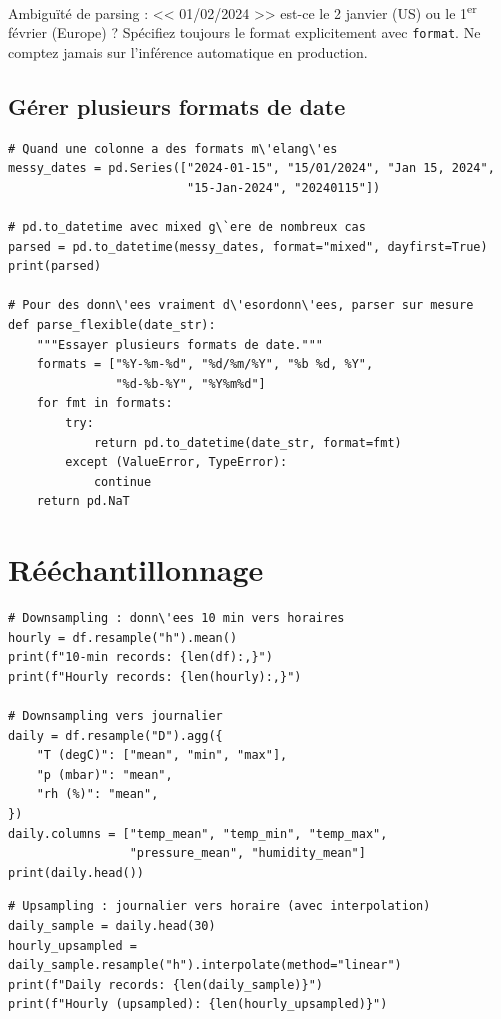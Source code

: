 \begin{warningbox}
Ambigu\"it\'e de parsing : << 01/02/2024 >> est-ce le 2 janvier (US) ou le 1\textsuperscript{er} f\'evrier (Europe) ? Sp\'ecifiez toujours le format explicitement avec \texttt{format}. Ne comptez jamais sur l'inf\'erence automatique en production.
\end{warningbox}

\subsection{G\'erer plusieurs formats de date}

\begin{verbatim}
# Quand une colonne a des formats m\'elang\'es
messy_dates = pd.Series(["2024-01-15", "15/01/2024", "Jan 15, 2024",
                         "15-Jan-2024", "20240115"])

# pd.to_datetime avec mixed g\`ere de nombreux cas
parsed = pd.to_datetime(messy_dates, format="mixed", dayfirst=True)
print(parsed)

# Pour des donn\'ees vraiment d\'esordonn\'ees, parser sur mesure
def parse_flexible(date_str):
    """Essayer plusieurs formats de date."""
    formats = ["%Y-%m-%d", "%d/%m/%Y", "%b %d, %Y",
               "%d-%b-%Y", "%Y%m%d"]
    for fmt in formats:
        try:
            return pd.to_datetime(date_str, format=fmt)
        except (ValueError, TypeError):
            continue
    return pd.NaT
\end{verbatim}

\section{R\'e\'echantillonnage}

\begin{verbatim}
# Downsampling : donn\'ees 10 min vers horaires
hourly = df.resample("h").mean()
print(f"10-min records: {len(df):,}")
print(f"Hourly records: {len(hourly):,}")

# Downsampling vers journalier
daily = df.resample("D").agg({
    "T (degC)": ["mean", "min", "max"],
    "p (mbar)": "mean",
    "rh (%)": "mean",
})
daily.columns = ["temp_mean", "temp_min", "temp_max",
                 "pressure_mean", "humidity_mean"]
print(daily.head())
\end{verbatim}

\begin{verbatim}
# Upsampling : journalier vers horaire (avec interpolation)
daily_sample = daily.head(30)
hourly_upsampled = daily_sample.resample("h").interpolate(method="linear")
print(f"Daily records: {len(daily_sample)}")
print(f"Hourly (upsampled): {len(hourly_upsampled)}")
\end{verbatim}

